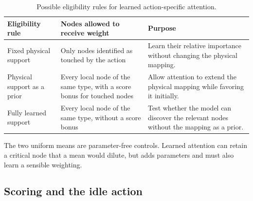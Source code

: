 \begin{table}[H]
  \centering
  \small
  \caption{Possible eligibility rules for learned action-specific attention.}
  \label{tab:candidate-attention-scopes}
  \setlength{\tabcolsep}{4pt}
  \begin{tabular}{L{0.24\textwidth}L{0.31\textwidth}L{0.35\textwidth}}
    \toprule
    Eligibility rule & Nodes allowed to receive weight & Purpose \\
    \midrule
    Fixed physical support
      & Only nodes identified as touched by the action
      & Learn their relative importance without changing the physical mapping. \\\addlinespace[2pt]
    Physical support as a prior
      & Every local node of the same type, with a score bonus for touched nodes
      & Allow attention to extend the physical mapping while favoring it initially. \\\addlinespace[2pt]
    Fully learned support
      & Every local node of the same type, without a score bonus
      & Test whether the model can discover the relevant nodes without the mapping as a prior. \\
    \bottomrule
  \end{tabular}
\end{table}

\noindent The two uniform means are parameter-free controls. Learned attention
can retain a critical node that a mean would dilute, but adds parameters and
must also learn a sensible weighting.

\subsection{Scoring and the idle action}
\label{subsec:candidate-scorer}

